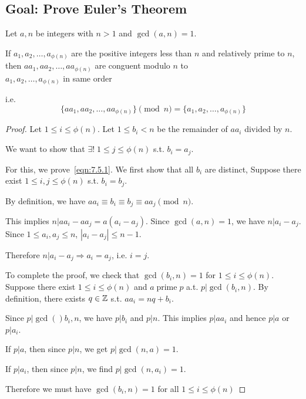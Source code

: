 \subsection*{Goal: Prove Euler's Theorem}
\begin{lemma}
    Let $a, n$ be integers with $n > 1$ and $\gcd(a, n) = 1$.

    If $a_1, a_2, \dots, a_{\phi(n)}$ are the positive integers less than $n$ and relatively prime to $n$, then
    $aa_1, aa_2, \dots, aa_{\phi(n)}$ are conguent modulo $n$ to \\ $a_1, a_2, \dots, a_{\phi(n)}$ in same order

    i.e.
    \[
        \tag*{*}
        \{aa_1, aa_2, \dots, aa_{\phi(n)}\} \pmod n = \{a_1, a_2, \dots, a_{\phi(n)}\}
        \label{eqn:7.5.1}
    \]
\end{lemma}
\begin{proof}
    Let $1 \leq i \leq \phi(n)$. Let $1 \leq b_i < n$ be the remainder of $aa_i$
    divided by $n$.

    We want to show that $\exists! \; 1 \leq j \leq \phi(n)$ s.t. $b_i = a_j$.

    For this, we prove~\eqref{eqn:7.5.1}. We first show that all $b_i$ are distinct, Suppose there exist
    $1 \leq i, j \leq \phi(n)$ s.t. $b_i = b_j$.

    By definition, we have $aa_i \equiv b_i \equiv b_j \equiv aa_j \pmod n$.

    This implies $n | aa_i -aa_j = a(a_i - a_j)$.
    Since $\gcd(a, n) = 1$, we have $n | a_i - a_j$.
    Since $1 \leq a_i, a_j \leq n$, $|a_i - a_j| \leq n - 1$.

    Therefore $n|a_i - a_j \Rightarrow a_i = a_j$, i.e. $i = j$.

    To complete the proof, we check that $\gcd(b_i, n) = 1$ for $1 \leq i \leq \phi(n)$.
    Suppose there exist $1 \leq i \leq \phi(n)$ and $a \; \text{prime}\; p$ a.t.
    $p | \gcd(b_i, n)$. By definition, there exists $q \in \mathbb{Z}$ s.t.
    $aa_i = nq + b_i$. 
    
    Since $p|\gcd()b_i, n$, we have $p | b_i$ and $p | n$. 
    This implies $p | aa_i$ and hence $p | a$ or $p | a_i$.
    
    If $p | a$, then since $p | n$, we get $p | \gcd(n, a) = 1$.

    If $p | a_i$, then since $p | n$, we find $p | \gcd(n, a_i) = 1$.

    Therefore we must have $\gcd(b_i, n) = 1$ for all $1 \leq i \leq \phi(n)$
\end{proof}
